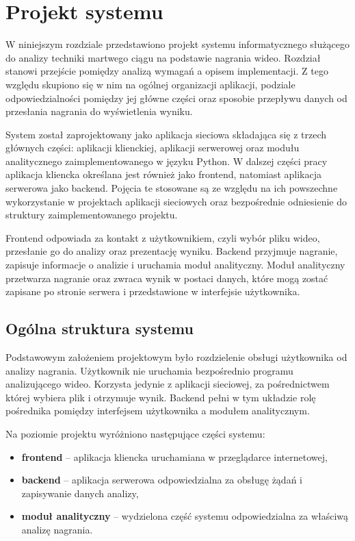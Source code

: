 \section{Projekt systemu}

W niniejszym rozdziale przedstawiono projekt systemu informatycznego służącego do analizy techniki martwego ciągu na podstawie nagrania wideo. Rozdział stanowi przejście pomiędzy analizą wymagań a opisem implementacji. Z tego względu skupiono się w nim na ogólnej organizacji aplikacji, podziale odpowiedzialności pomiędzy jej główne części oraz sposobie przepływu danych od przesłania nagrania do wyświetlenia wyniku.

System został zaprojektowany jako aplikacja sieciowa składająca się z trzech głównych części: aplikacji klienckiej, aplikacji serwerowej oraz modułu analitycznego zaimplementowanego w języku Python. W dalszej części pracy aplikacja kliencka określana jest również jako frontend, natomiast aplikacja serwerowa jako backend. Pojęcia te stosowane są ze względu na ich powszechne wykorzystanie w projektach aplikacji sieciowych oraz bezpośrednie odniesienie do struktury zaimplementowanego projektu.

Frontend odpowiada za kontakt z użytkownikiem, czyli wybór pliku wideo, przesłanie go do analizy oraz prezentację wyniku. Backend przyjmuje nagranie, zapisuje informacje o analizie i uruchamia moduł analityczny. Moduł analityczny przetwarza nagranie oraz zwraca wynik w postaci danych, które mogą zostać zapisane po stronie serwera i przedstawione w interfejsie użytkownika.

\subsection{Ogólna struktura systemu}

Podstawowym założeniem projektowym było rozdzielenie obsługi użytkownika od analizy nagrania. Użytkownik nie uruchamia bezpośrednio programu analizującego wideo. Korzysta jedynie z aplikacji sieciowej, za pośrednictwem której wybiera plik i otrzymuje wynik. Backend pełni w tym układzie rolę pośrednika pomiędzy interfejsem użytkownika a modułem analitycznym.

Na poziomie projektu wyróżniono następujące części systemu:

\begin{itemize}
\item \textbf{frontend} -- aplikacja kliencka uruchamiana w przeglądarce internetowej,
\item \textbf{backend} -- aplikacja serwerowa odpowiedzialna za obsługę żądań i zapisywanie danych analizy,
\item \textbf{moduł analityczny} -- wydzielona część systemu odpowiedzialna za właściwą analizę nagrania.
\end{itemize}

